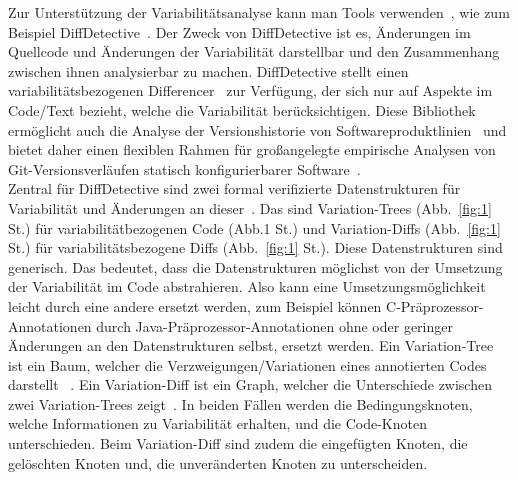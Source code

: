 Zur Unterstützung der Variabilitätsanalyse kann man Tools verwenden~\cite{SSK+:VaMoS20,10.1145/2660190.2662113}, wie zum Beispiel DiffDetective~\cite{BSM+:FSE24Companion}. Der Zweck von DiffDetective ist es, Änderungen im Quellcode und Änderungen der Variabilität darstellbar und den Zusammenhang zwischen ihnen analysierbar zu machen. DiffDetective stellt einen variabilitätsbezogenen Differencer~\cite{BTS+:ESECFSE22,BSM+:FSE24Companion} zur Verfügung, der sich nur auf Aspekte im Code/Text bezieht, welche die Variabilität berücksichtigen. Diese Bibliothek ermöglicht auch die Analyse der Versionshistorie von Softwareproduktlinien~\cite{BTS+:ESECFSE22} und bietet daher einen flexiblen Rahmen für großangelegte empirische Analysen von Git-Versionsverläufen statisch konfigurierbarer Software~\cite{BSG+:SPLC23,BSM+:FSE24Companion}.\\

Zentral für DiffDetective sind zwei formal verifizierte Datenstrukturen für Variabilität und Änderungen an dieser~\cite{BTS+:ESECFSE22}. Das sind Variation-Trees (Abb.~\ref{fig:1} St.) für variabilitätbezogenen Code (Abb.1 St.) und Variation-Diffs (Abb.~\ref{fig:1} St.) für variabilitätsbezogene Diffs (Abb.~\ref{fig:1} St.). Diese Datenstrukturen sind generisch. Das bedeutet, dass die Datenstrukturen möglichst von der Umsetzung der Variabilität im Code abstrahieren. Also kann eine Umsetzungsmöglichkeit leicht durch eine andere ersetzt werden, zum Beispiel können C-Präprozessor-Annotationen  durch Java-Präprozessor-Annotationen ohne oder geringer Änderungen an den Datenstrukturen selbst, ersetzt werden. Ein Variation-Tree ist ein Baum, welcher die Verzweigungen/Variationen eines annotierten Codes darstellt ~\cite{BTS+:ESECFSE22,BSG+:SPLC23,BSM+:FSE24Companion}. Ein Variation-Diff ist ein Graph, welcher die Unterschiede zwischen zwei Variation-Trees zeigt~\cite{BTS+:ESECFSE22,BSG+:SPLC23,BSM+:FSE24Companion}. In beiden Fällen werden die Bedingungsknoten, welche Informationen zu Variabilität erhalten, und die Code-Knoten unterschieden. Beim Variation-Diff sind zudem die eingefügten Knoten, die gelöschten Knoten und, die unveränderten Knoten zu unterscheiden.\\



